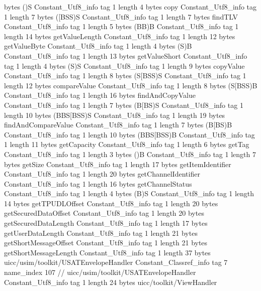 {{{			bytes	()S
		}
		Constant_Utf8_info {
			tag	1
			length	4
			bytes	copy
		}
		Constant_Utf8_info {
			tag	1
			length	7
			bytes	([BSS)S
		}
		Constant_Utf8_info {
			tag	1
			length	7
			bytes	findTLV
		}
		Constant_Utf8_info {
			tag	1
			length	5
			bytes	(BB)B
		}
		Constant_Utf8_info {
			tag	1
			length	14
			bytes	getValueLength
		}
		Constant_Utf8_info {
			tag	1
			length	12
			bytes	getValueByte
		}
		Constant_Utf8_info {
			tag	1
			length	4
			bytes	(S)B
		}
		Constant_Utf8_info {
			tag	1
			length	13
			bytes	getValueShort
		}
		Constant_Utf8_info {
			tag	1
			length	4
			bytes	(S)S
		}
		Constant_Utf8_info {
			tag	1
			length	9
			bytes	copyValue
		}
		Constant_Utf8_info {
			tag	1
			length	8
			bytes	(S[BSS)S
		}
		Constant_Utf8_info {
			tag	1
			length	12
			bytes	compareValue
		}
		Constant_Utf8_info {
			tag	1
			length	8
			bytes	(S[BSS)B
		}
		Constant_Utf8_info {
			tag	1
			length	16
			bytes	findAndCopyValue
		}
		Constant_Utf8_info {
			tag	1
			length	7
			bytes	(B[BS)S
		}
		Constant_Utf8_info {
			tag	1
			length	10
			bytes	(BBS[BSS)S
		}
		Constant_Utf8_info {
			tag	1
			length	19
			bytes	findAndCompareValue
		}
		Constant_Utf8_info {
			tag	1
			length	7
			bytes	(B[BS)B
		}
		Constant_Utf8_info {
			tag	1
			length	10
			bytes	(BBS[BSS)B
		}
		Constant_Utf8_info {
			tag	1
			length	11
			bytes	getCapacity
		}
		Constant_Utf8_info {
			tag	1
			length	6
			bytes	getTag
		}
		Constant_Utf8_info {
			tag	1
			length	3
			bytes	()B
		}
		Constant_Utf8_info {
			tag	1
			length	7
			bytes	getSize
		}
		Constant_Utf8_info {
			tag	1
			length	17
			bytes	getItemIdentifier
		}
		Constant_Utf8_info {
			tag	1
			length	20
			bytes	getChannelIdentifier
		}
		Constant_Utf8_info {
			tag	1
			length	16
			bytes	getChannelStatus
		}
		Constant_Utf8_info {
			tag	1
			length	4
			bytes	(B)S
		}
		Constant_Utf8_info {
			tag	1
			length	14
			bytes	getTPUDLOffset
		}
		Constant_Utf8_info {
			tag	1
			length	20
			bytes	getSecuredDataOffset
		}
		Constant_Utf8_info {
			tag	1
			length	20
			bytes	getSecuredDataLength
		}
		Constant_Utf8_info {
			tag	1
			length	17
			bytes	getUserDataLength
		}
		Constant_Utf8_info {
			tag	1
			length	21
			bytes	getShortMessageOffset
		}
		Constant_Utf8_info {
			tag	1
			length	21
			bytes	getShortMessageLength
		}
		Constant_Utf8_info {
			tag	1
			length	37
			bytes	uicc/usim/toolkit/USATEnvelopeHandler
		}
		Constant_Classref_info {
			tag	7
			name_index	107		// uicc/usim/toolkit/USATEnvelopeHandler
		}
		Constant_Utf8_info {
			tag	1
			length	24
			bytes	uicc/toolkit/ViewHandler
		}
}}
